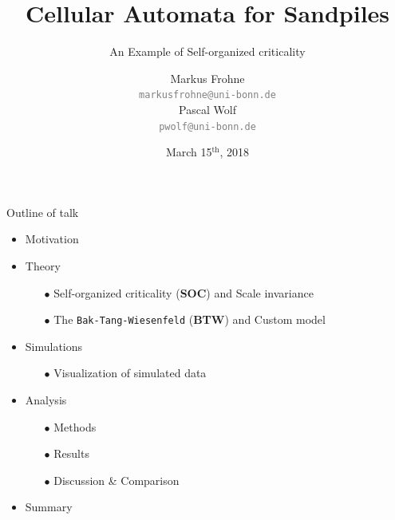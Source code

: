 \documentclass[xcolor=dvipsnames]{beamer}
\title[Sandpiles]{Cellular Automata for Sandpiles}
\subtitle{An Example of Self-organized criticality}
\author[M. Frohne \& P. Wolf]{Markus Frohne\\ \texttt{\textcolor{gray}{markusfrohne@uni-bonn.de}}\\
        \vspace{0.33cm} Pascal Wolf\\ \texttt{\textcolor{gray}{pwolf@uni-bonn.de}}}
\date{March 15$^\text{th}$, 2018}
\newcommand{\myitemsep}{\setlength\itemsep{0.33cm}}
\newcommand{\mysubitemsep}{\setlength\itemsep{0.22cm}}
\begin{document}
    
    \begin{frame}
        \titlepage
    \end{frame}
    
    \begin{frame}[t]{Outline of talk}
        \begin{itemize}
            \myitemsep
            \item Motivation
            \item {Theory
                \vspace{0.22cm}
                \begin{itemize}
                    \mysubitemsep
                    \item[$\bullet$] Self-organized criticality (\textbf{SOC}) and Scale invariance
                    \item[$\bullet$] The \texttt{Bak-Tang-Wiesenfeld} (\textbf{BTW}) and Custom model
                \end{itemize}}
            \item {Simulations
                \vspace{0.22cm}
                \begin{itemize}
                    \mysubitemsep
                    \item[$\bullet$] Visualization of simulated data
                \end{itemize}}
            \item {Analysis
                \vspace{0.22cm}
                \begin{itemize}
                    \mysubitemsep
                    \item[$\bullet$] Methods
                    \item[$\bullet$] Results
                    \item[$\bullet$] Discussion \& Comparison
                \end{itemize}}
            \item Summary
        \end{itemize}
    \end{frame}
    
\end{document}
